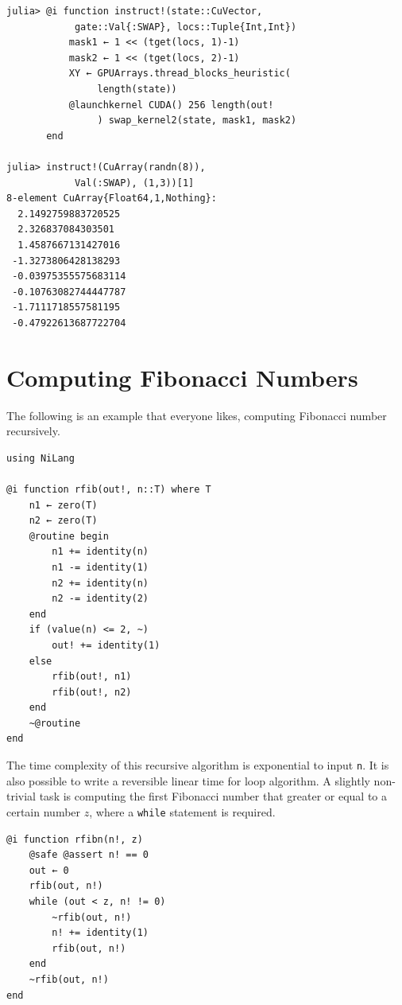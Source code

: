 \documentclass[aps,twocolumn,longbibliography,english,superscriptaddress]{revtex4-1}
\newcommand{\<}{\langle}
\renewcommand{\>}{\rangle}
\theoremstyle{definition}\newtheorem{definition}{\textit{Definition}}
\begin{document}
\begin{minipage}{.44\textwidth}
\begin{lstlisting}
julia> @i function instruct!(state::CuVector,
            gate::Val{:SWAP}, locs::Tuple{Int,Int})
           mask1 ← 1 << (tget(locs, 1)-1)
           mask2 ← 1 << (tget(locs, 2)-1)
           XY ← GPUArrays.thread_blocks_heuristic(
                length(state))
           @launchkernel CUDA() 256 length(out!
                ) swap_kernel2(state, mask1, mask2)
       end

julia> instruct!(CuArray(randn(8)),
            Val(:SWAP), (1,3))[1]
8-element CuArray{Float64,1,Nothing}:
  2.1492759883720525 
  2.326837084303501  
  1.4587667131427016 
 -1.3273806428138293 
 -0.03975355575683114
 -0.10763082744447787
 -1.7111718557581195 
 -0.47922613687722704
\end{lstlisting}
\end{minipage}


\section{Computing Fibonacci Numbers}\label{app:fib}
The following is an example that everyone likes, computing Fibonacci number recursively.

\begin{minipage}{.44\textwidth}
    \begin{lstlisting}
using NiLang

@i function rfib(out!, n::T) where T
    n1 ← zero(T)
    n2 ← zero(T)
    @routine begin
        n1 += identity(n)
        n1 -= identity(1)
        n2 += identity(n)
        n2 -= identity(2)
    end
    if (value(n) <= 2, ~)
        out! += identity(1)
    else
        rfib(out!, n1)
        rfib(out!, n2)
    end
    ~@routine
end
\end{lstlisting}
\end{minipage}

The time complexity of this recursive algorithm is exponential to input \texttt{n}. It is also possible to write a reversible linear time for loop algorithm.
A slightly non-trivial task is computing the first Fibonacci number that greater or equal to a certain number $z$, where a \texttt{while} statement is required.

\begin{minipage}{.44\textwidth}
\begin{lstlisting}
@i function rfibn(n!, z)
    @safe @assert n! == 0
    out ← 0
    rfib(out, n!)
    while (out < z, n! != 0)
        ~rfib(out, n!)
        n! += identity(1)
        rfib(out, n!)
    end
    ~rfib(out, n!)
end
\end{lstlisting}
\end{minipage}
\end{document}
